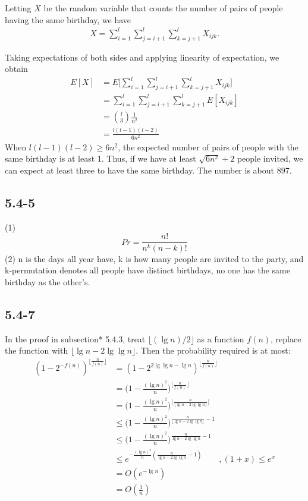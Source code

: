 \documentclass{book}
\begin{document}
\begin{CJK}{UTF8}{gkai}
Letting $X$ be the random variable that counts the number of pairs of people 
having the same birthday, we have
\begin{align*}
X = \sum_{i=1}^{l}\sum_{j=i+1}^{l}\sum_{k=j+1}^{l}X_{ijk}.
\end{align*}

Taking expectations of both sides and applying linearity of expectation, we 
obtain
\begin{align*}
E[X] & = E \Bigg[\sum_{i=1}^{l}\sum_{j=i+1}^{l}\sum_{k=j+1}^{l}X_{ijk} \Bigg] \\
& = \sum_{i=1}^{l}\sum_{j=i+1}^{l}\sum_{k=j+1}^{l}E[X_{ijk}] \\
& = \binom{l}{3}\frac{1}{n^2} \\
& = \frac{l(l-1)(l-2)}{6n^2}
\end{align*}
When $l(l-1)(l-2) \ge 6n^2$, the expected number of pairs of people with the 
same birthday is at least 1. Thus, if we have at least $\sqrt{6n^2}+2$ people 
invited, we can expect at least three to have the same birthday. The number is 
about 897.

\subsection*{5.4-5}
(1) $$Pr = \frac{n!}{n^k(n-k)!}$$
(2) n is the days all year have, k is how many people are invited to the party, 
and k-permutation denotes all people have distinct birthdays, no one has the 
same birthday as the other's.

\subsection*{5.4-7}
In the proof in subsection* 5.4.3, treat $\lfloor(\lg n)/2\rfloor$ as a function 
$f(n)$, replace the function with $\lfloor\lg n - 2\lg\lg n\rfloor$.
Then the probability required is at most:
\begin{align*}
  (1-2^{-f(n)})^{\lfloor \frac{n}{f(n)}\rfloor} & = (1-2^{2\lg\lg n - \lg n})^{\lfloor\frac{n}{f(n)}\rfloor}\\
  & = \bigg(1 - \frac{(\lg n)^2}{n}\bigg)^{\lfloor\frac{n}{f(n)}\rfloor} \\
  & = \bigg(1 - \frac{(\lg n)^2}{n}\bigg)^{\lfloor\frac{n}{\lfloor \lg n - 2\lg \lg n \rfloor }\rfloor} \\
  & \le \bigg(1 - \frac{(\lg n)^2}{n}\bigg)^{\frac{n}{\lfloor \lg n - 2\lg \lg n \rfloor }-1} \\
  & \le \bigg(1 - \frac{(\lg n)^2}{n}\bigg)^{\frac{n}{\lg n - 2\lg \lg n}-1} \\
  & \le e^{-\frac{(\lg n)^2}{n} (\frac{n}{\lg n - 2\lg \lg n} - 1)} \qquad, (1+x) \le e^x\\
& = O(e^{-\lg n}) \\
& = O(\frac{1}{n})
\end{align*}


\end{CJK}
\end{document}
